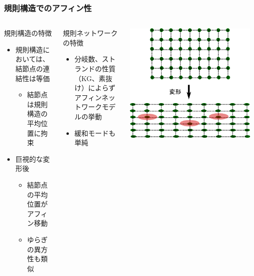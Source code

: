 \documentclass[aspectratio=169,11pt, dvipdfmx]{beamer}
\begin{document}
\begin{frame}
	\frametitle{規則構造でのアフィン性}
		\vspace{-2mm}
		\begin{columns}[totalwidth=\linewidth]
				\begin{block}{規則構造の特徴}
					\begin{itemize}
						\item 規則構造においては、結節点の\alert{連結性は等価}
							\begin{itemize}
								\item 結節点は規則構造の平均位置に拘束
							\end{itemize}
						\item 巨視的な変形後
							\begin{itemize}
								\item 結節点の\alert{平均位置がアフィン移動}
								\item ゆらぎの異方性も類似
							\end{itemize}
					\end{itemize}
				\end{block}

                \begin{alertblock}{規則ネットワークの特徴}
                    \begin{itemize}
                        \item 分岐数、ストランドの性質（KG、素抜け）によらず\\\alert{アフィンネットワークモデルの挙動}
                        \item {緩和モードも単純}
                    \end{itemize}
                \end{alertblock}

				\includegraphics[width=.8\columnwidth]{reglar_NW_2.png}
		\end{columns}
		
\end{frame}
\end{document}
